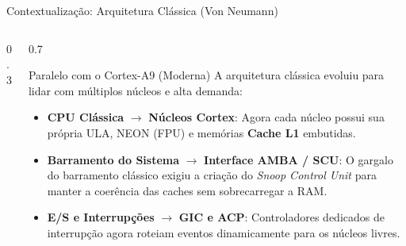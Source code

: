 \documentclass[aspectratio=169]{beamer}
\begin{document}
\begin{frame}{Contextualização: Arquitetura Clássica (Von Neumann)}
\begin{columns}[T]
\begin{column}{0.3\textwidth}
{
            }
        \end{column}
        \begin{column}{0.7\textwidth}
            \begin{block}{Paralelo com o Cortex-A9 (Moderna)}
                A arquitetura clássica evoluiu para lidar com múltiplos núcleos e alta demanda:
                \vspace{0.5em}
                \begin{itemize}
                    \item \textbf{CPU Clássica} $\rightarrow$ \textbf{Núcleos Cortex}: Agora cada núcleo possui sua própria ULA, NEON (FPU) e memórias \textbf{Cache L1} embutidas.
                    \item \textbf{Barramento do Sistema} $\rightarrow$ \textbf{Interface AMBA / SCU}: O gargalo do barramento clássico exigiu a criação do \textit{Snoop Control Unit} para manter a coerência das caches sem sobrecarregar a RAM.
                    \item \textbf{E/S e Interrupções} $\rightarrow$ \textbf{GIC e ACP}: Controladores dedicados de interrupção agora roteiam eventos dinamicamente para os núcleos livres.
                \end{itemize}
            \end{block}
        \end{column}
    \end{columns}
\end{frame}
\end{document}
